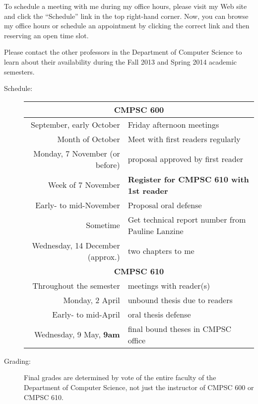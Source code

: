 \noindent
To schedule a meeting with me during my office hours, please visit my Web site and click the ``Schedule'' link in the
top right-hand corner. Now, you can browse my office hours or schedule an appointment by clicking the correct link and
then reserving an open time slot. 

\noindent
Please contact the other professors in the Department of Computer Science to learn about their availability during the
Fall 2013 and Spring 2014 academic semesters.

\begin{description}

\item[Schedule:]\mbox{}

\begin{center}
\begin{tabular}{rl}
\hline
\multicolumn{2}{c}{\bf CMPSC 600}\\\hline
September, early October & Friday afternoon meetings\\
Month of October & Meet with first readers regularly\\
Monday, 7 November (or before) & proposal approved by first reader\\
Week of 7 November & \bf Register for CMPSC 610 with 1st reader\\
Early- to mid-November & Proposal oral defense\\
Sometime & Get technical report number from Pauline Lanzine\\
Wednesday, 14 December (approx.) & two chapters to me\\
\hline
\multicolumn{2}{c}{\bf CMPSC 610}\\\hline
Throughout the semester & meetings with reader(s)\\ 
Monday, 2 April & unbound thesis due to readers\\
Early- to mid-April & oral thesis defense\\
Wednesday, 9 May, \bf 9am & final bound theses in CMPSC office
\end{tabular}
\end{center}

\item[Grading:]
Final grades are determined by vote of
the entire faculty of the Department of Computer Science, not just the
instructor of CMPSC 600 or CMPSC 610.


\end{description}
